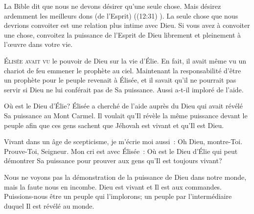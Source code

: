 La Bible dit que nous ne devons désirer qu'une seule chose.
 \og Mais désirez ardemment les meilleurs dons (de l'Esprit) \fg{}
 ((12:31) \KJF).
 La seule chose que nous devrions convoiter est une relation
 plus intime avec Dieu. Si vous avez à convoiter une chose,
 convoitez la puissance de l'Esprit de Dieu librement
 et pleinement à l'\oe{}uvre dans votre vie. 

\dvrule






\lettrine{É}{lisée avait vu} le pouvoir de Dieu sur la vie d'Élie.
 En fait, il avait même vu un chariot de feu emmener le prophète au ciel.
 Maintenant la responsabilité d'être un prophète pour le peuple
 revenait à Élisée, et il savait qu'il ne pourrait pas servir si Dieu
 ne lui conférait pas de Sa puissance. Aussi a-t-il imploré de l'aide. 

\og Où est le Dieu d'Élie? \fg{}
 Élisée a cherché de l'aide auprès du Dieu qui avait révélé
 Sa puissance au Mont Carmel. Il voulait qu'Il révèle la même puissance
 devant le peuple afin que ces gens sachent que Jéhovah
 est vivant et qu'Il est Dieu. 


Vivant dans un âge de scepticisme, je m'écrie moi aussi~:
 \og Oh Dieu, montre-Toi. Prouve-Toi, Seigneur. \fg{}
 Mon cri est avec Élisée~: Où est le Dieu d'Élie qui peut démontrer
 Sa puissance pour prouver aux gens qu'Il est toujours vivant? 

Nous ne voyons pas la démonstration de la puissance de Dieu dans notre monde,
 mais la faute nous en incombe. Dieu est vivant et Il est aux commandes.
 Puissions-nous être un peuple qui l'implorons; un peuple par l'intermédiaire
 duquel Il est révélé au monde. 

\dvrule



